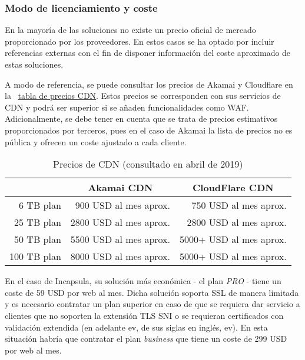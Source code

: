 \subsubsection{Modo de licenciamiento y coste}
\label{subsec:wafsaaslic}
\par En la mayoría de las soluciones no existe un precio oficial de mercado proporcionado por los proveedores. En estos casos se ha optado por
incluir referencias externas con el fin de disponer información del coste aproximado de estas soluciones.
\par A modo de referencia, se puede consultar los precios de Akamai y Cloudflare en la {~\hyperref[tab:precioscdn]{tabla de precios CDN}}.
Estos precios se corresponden con sus servicios de CDN y podrá ser superior si se añaden funcionalidades como WAF. Adicionalmente, se debe
tener en cuenta que se trata de precios estimativos proporcionados por terceros, pues en el caso de Akamai la lista de precios no es pública y
ofrecen un coste ajustado a cada cliente.
\begin{table}[h!]
  \centering
  \label{tab:precioscdn}
  \begin{tabular}{rrr}
     &
    \multicolumn{1}{c}{\textbf{Akamai CDN}} &
    \multicolumn{1}{c}{\textbf{CloudFlare CDN}} \\
    \hline \hline
    6 TB plan   & 900  USD al mes aprox.  & 750   USD al mes aprox. \\
    \hline
    25 TB plan  & 2800 USD al mes aprox.  & 2800  USD al mes aprox. \\
    \hline
    50 TB plan  & 5500 USD al mes aprox.  & 5000+ USD al mes aprox. \\
    \hline
    100 TB plan & 8000 USD al mes aprox.  & 5000+ USD al mes aprox. \\
    \hline
  \end{tabular}
  \caption{Precios de CDN\cite{cdnprices} (consultado en abril de 2019)}
\end{table}

\par En el caso de Incapsula, su solución más económica - el plan {\em PRO} -  tiene un coste de 59 USD por web al mes\cite{incapsulaprices}.
Dicha solución soporta SSL de manera limitada y es necesario contratar un plan superior en caso de que se requiera dar servicio a clientes que
no soporten la extensión TLS \acrshort{SNI} o se requieran certificados con validación extendida (en adelante \acrshort{ev}, de sus siglas en
inglés, \acrlong{ev}). En esta situación habría que contratar el plan {\em business} que tiene un coste de 299 USD por web al
mes\cite{incapsulaprices}.

